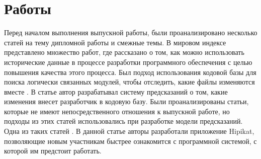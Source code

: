 \documentclass[times]{itmo-student-thesis}
\begin{document}
\section{Работы}
Перед началом выполнения выпускной работы, были проанализировано несколько статей на тему дипломной работы и смежные темы. В мировом индексе представлено множество работ, где рассказано о том, как можно использовать исторические данные в процессе разработки программного обеспечения с целью повышения качества этого процесса. Был подход использования кодовой базы для поиска логически связанных модулей, чтобы отследить, какие файлы изменяются вместе \cite{logical-modules}. В статье \cite{source-change} автор разрабатывал систему предсказаний о том, какие изменения внесет разработчик в кодовую базу. Были проанализированы статьи, которые не имеют непосредственного отношения к выпускной работе, но подходы из этих статей использовались при разработке модели предсказаний. Одна из таких статей \cite{project-memory}. В данной статье авторы разработали приложение Hipikat, позволяющие новым участникам быстрее ознакомится с программной системой, с которой им предстоит работать.
\end{document}
